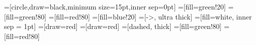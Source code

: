 \usepackage{tikz}
\usepackage{xstring}
\usepackage{pgfplots}
\usepackage{etoolbox}
\usepackage{ifthen}
\usetikzlibrary{arrows,shapes}
\usetikzlibrary{positioning, calc}


=[circle,draw=black,minimum size=15pt,inner sep=0pt]
=[fill=green!20]
=[fill=green!80]
=[fill=red!80]
=[fill=blue!20]
=[->, ultra thick]
=[fill=white, inner sep = 1pt]
=[draw=red]
=[draw=red]
=[dashed, thick]
=[fill=green!80]
=[fill=red!80]

\newcommand\ifMaxFlow[4]{
	\begingroup
		\pgfmathsetmacro{\flow}{#1}
		\pgfmathsetmacro{\cap}{#2}
		\pgfmathparse{ifthenelse(\flow == \cap,1,0)}
		\ifdim\pgfmathresult pt= 1 pt
			 #3
			\else
			 #4
		\fi
	\endgroup
}

\newcommand\ifSomeFlow[3]{
	\begingroup
		\pgfmathsetmacro{\flow}{#1}
		\pgfmathparse{ifthenelse(\flow > 0,1,0)}
		\ifdim\pgfmathresult pt= 1 pt
			 #2
			\else
			 #3
		\fi
	\endgroup
}

